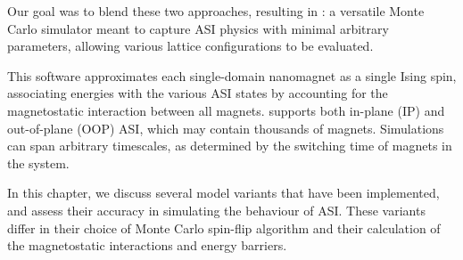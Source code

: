 Our goal was to blend these two approaches, resulting in \hotspice: a versatile Monte Carlo simulator meant to capture ASI physics with minimal arbitrary parameters, allowing various lattice configurations to be evaluated. \par
This software approximates each single-domain nanomagnet as a single Ising spin, associating energies with the various ASI states by accounting for the magnetostatic interaction between all magnets.
\hotspice supports both in-plane (IP) and out-of-plane (OOP) ASI, which may contain thousands of magnets. Simulations can span arbitrary timescales, as determined by the switching time of magnets in the system. \\\par

In this chapter, we discuss several model variants that have been implemented, and assess their accuracy in simulating the behaviour of ASI.
These variants differ in their choice of Monte Carlo spin-flip algorithm and their calculation of the magnetostatic interactions and energy barriers. \\\par

